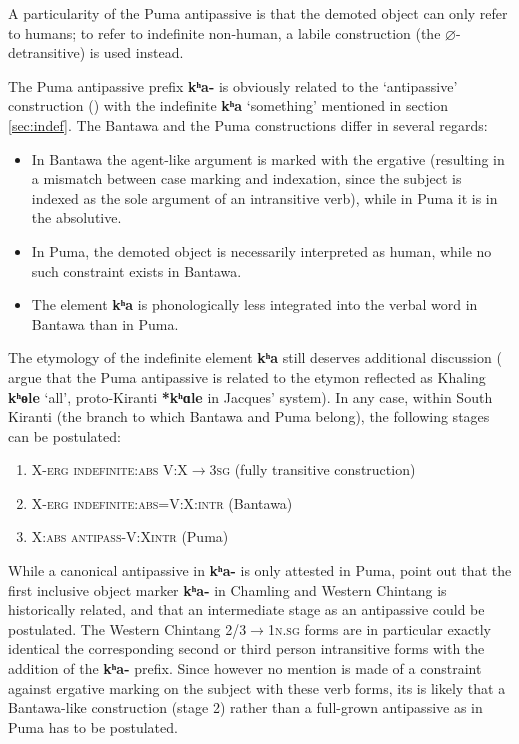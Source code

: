 \documentclass[oneside,a4paper,11pt]{article}
\newcommand{\ipa}[1]{{\phon\textbf{#1}}}
\begin{document}
A particularity of the Puma antipassive is that the demoted object can only refer to humans; to refer to indefinite non-human, a labile construction (the $\varnothing$-detransitive) is used instead.

The Puma antipassive prefix \ipa{kʰa-} is obviously related to the `antipassive' construction (\citealt[226;335]{doornenbal09}) with the indefinite \ipa{kʰa} `something' mentioned in section \ref{sec:indef}. The Bantawa and the Puma constructions differ in several regards:
\begin{itemize}
\item In Bantawa the agent-like argument is marked with the ergative (resulting in a mismatch between case marking and indexation, since the subject is indexed as the sole argument of an intransitive verb), while in Puma it is in the absolutive.
\item In Puma, the demoted object is necessarily interpreted as human, while no such constraint exists in Bantawa.
\item The element \ipa{kʰa} is phonologically less integrated into the verbal word in Bantawa than in Puma.
\end{itemize}

The etymology of the indefinite element \ipa{kʰa} still deserves additional discussion (\citealt[67]{bickel15antipassive} argue that the Puma antipassive is related to the etymon reflected as Khaling \ipa{kʰɵle} `all', proto-Kiranti \ipa{*kʰɑle} in Jacques' \citeyear{jacques17pkiranti} system). In any case, within South Kiranti (the branch to which Bantawa and Puma belong), the following stages can be postulated:

\begin{enumerate}
\item X-\textsc{erg} {   } \textsc{indefinite}:\textsc{abs} {   } V:X$\rightarrow$\textsc{3sg} (fully transitive construction)
\item X-\textsc{erg} {   } \textsc{indefinite}:\textsc{abs}=V:X:\textsc{intr} (Bantawa)
\item X:\textsc{abs} \textsc{antipass}-V:X\textsc{intr} (Puma)
\end{enumerate}

While a canonical antipassive in \ipa{kʰa-} is only attested in Puma, \citet{bickel15antipassive} point out that the first inclusive object marker \ipa{kʰa-} in Chamling and Western Chintang is historically related, and that an intermediate stage as an antipassive could be postulated. The Western Chintang 2/3$\rightarrow$\textsc{1n.sg} forms are in particular exactly identical the corresponding second or third person intransitive forms with the addition of the \ipa{kʰa-} prefix. Since however no mention is made of a constraint against ergative marking on the subject with these verb forms, its is likely that a Bantawa-like construction (stage 2) rather than a full-grown antipassive as in Puma  has to be postulated.
\end{document}
